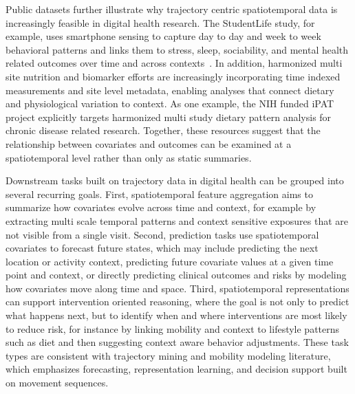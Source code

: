 \documentclass[acmsmall]{acmart}
\begin{document}
Public datasets further illustrate why trajectory centric spatiotemporal data is increasingly feasible in digital health research. The StudentLife study, for example, uses smartphone sensing to capture day to day and week to week behavioral patterns and links them to stress, sleep, sociability, and mental health related outcomes over time and across contexts~\cite{wang2014studentlife}. In addition, harmonized multi site nutrition and biomarker efforts are increasingly incorporating time indexed measurements and site level metadata, enabling analyses that connect dietary and physiological variation to context. As one example, the NIH funded iPAT project explicitly targets harmonized multi study dietary pattern analysis for chronic disease related research\cite{Fang2021iPAT}. Together, these resources suggest that the relationship between covariates and outcomes can be examined at a spatiotemporal level rather than only as static summaries.

Downstream tasks built on trajectory data in digital health can be grouped into several recurring goals. First, spatiotemporal feature aggregation aims to summarize how covariates evolve across time and context, for example by extracting multi scale temporal patterns and context sensitive exposures that are not visible from a single visit. Second, prediction tasks use spatiotemporal covariates to forecast future states, which may include predicting the next location or activity context, predicting future covariate values at a given time point and context, or directly predicting clinical outcomes and risks by modeling how covariates move along time and space. Third, spatiotemporal representations can support intervention oriented reasoning, where the goal is not only to predict what happens next, but to identify when and where interventions are most likely to reduce risk, for instance by linking mobility and context to lifestyle patterns such as diet and then suggesting context aware behavior adjustments. These task types are consistent with trajectory mining and mobility modeling literature, which emphasizes forecasting, representation learning, and decision support built on movement sequences.
\end{document}
